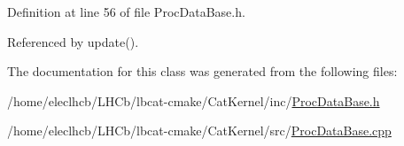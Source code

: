 Definition at line 56 of file ProcDataBase.h.

Referenced by update().

The documentation for this class was generated from the following files:\begin{DoxyCompactItemize}
\item 
/home/eleclhcb/LHCb/lbcat-\/cmake/CatKernel/inc/\hyperlink{ProcDataBase_8h}{ProcDataBase.h}\item 
/home/eleclhcb/LHCb/lbcat-\/cmake/CatKernel/src/\hyperlink{ProcDataBase_8cpp}{ProcDataBase.cpp}\end{DoxyCompactItemize}
